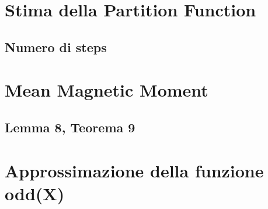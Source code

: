 \section{Stima della Partition Function}
\subsection{Numero di steps}

\section{Mean Magnetic Moment}
\subsection{Lemma 8, Teorema 9}

\section{Approssimazione della funzione odd(X)}

